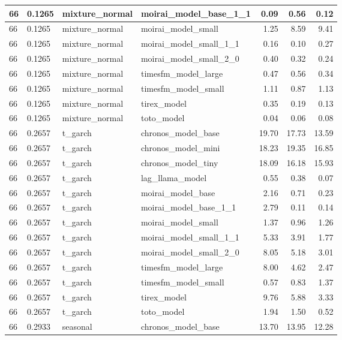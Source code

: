 {\begin{tabular}{llllrrr}
\midrule
66 & 0.1265 & mixture\_normal & moirai\_model\_base\_1\_1 & 0.09 & 0.56 & 0.12 \\
\midrule
66 & 0.1265 & mixture\_normal & moirai\_model\_small & 1.25 & 8.59 & 9.41 \\
\midrule
66 & 0.1265 & mixture\_normal & moirai\_model\_small\_1\_1 & 0.16 & 0.10 & 0.27 \\
\midrule
66 & 0.1265 & mixture\_normal & moirai\_model\_small\_2\_0 & 0.40 & 0.32 & 0.24 \\
\midrule
66 & 0.1265 & mixture\_normal & timesfm\_model\_large & 0.47 & 0.56 & 0.34 \\
\midrule
66 & 0.1265 & mixture\_normal & timesfm\_model\_small & 1.11 & 0.87 & 1.13 \\
\midrule
66 & 0.1265 & mixture\_normal & tirex\_model & 0.35 & 0.19 & 0.13 \\
\midrule
66 & 0.1265 & mixture\_normal & toto\_model & 0.04 & 0.06 & 0.08 \\
\midrule
66 & 0.2657 & t\_garch & chronos\_model\_base & 19.70 & 17.73 & 13.59 \\
\midrule
66 & 0.2657 & t\_garch & chronos\_model\_mini & 18.23 & 19.35 & 16.85 \\
\midrule
66 & 0.2657 & t\_garch & chronos\_model\_tiny & 18.09 & 16.18 & 15.93 \\
\midrule
66 & 0.2657 & t\_garch & lag\_llama\_model & 0.55 & 0.38 & 0.07 \\
\midrule
66 & 0.2657 & t\_garch & moirai\_model\_base & 2.16 & 0.71 & 0.23 \\
\midrule
66 & 0.2657 & t\_garch & moirai\_model\_base\_1\_1 & 2.79 & 0.11 & 0.14 \\
\midrule
66 & 0.2657 & t\_garch & moirai\_model\_small & 1.37 & 0.96 & 1.26 \\
\midrule
66 & 0.2657 & t\_garch & moirai\_model\_small\_1\_1 & 5.33 & 3.91 & 1.77 \\
\midrule
66 & 0.2657 & t\_garch & moirai\_model\_small\_2\_0 & 8.05 & 5.18 & 3.01 \\
\midrule
66 & 0.2657 & t\_garch & timesfm\_model\_large & 8.00 & 4.62 & 2.47 \\
\midrule
66 & 0.2657 & t\_garch & timesfm\_model\_small & 0.57 & 0.83 & 1.37 \\
\midrule
66 & 0.2657 & t\_garch & tirex\_model & 9.76 & 5.88 & 3.33 \\
\midrule
66 & 0.2657 & t\_garch & toto\_model & 1.94 & 1.50 & 0.52 \\
\midrule
66 & 0.2933 & seasonal & chronos\_model\_base & 13.70 & 13.95 & 12.28 \\

\end{tabular}}
